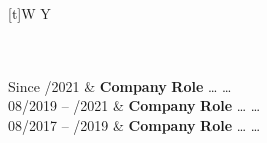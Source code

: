 \begin{xltabular}{\textwidth}[t]{W Y}

 \hrulefill \\ \\ 

Since /2021 			&	\textbf{Company} \newline
						\textbf{Role} \newline
						\dots \newline
						\dots \newline
						\\
					
08/2019 – /2021 			&	\textbf{Company} \newline
						\textbf{Role} \newline
						\dots \newline
						\dots \newline
						\\

					
08/2017 – /2019 			&	\textbf{Company} \newline
						\textbf{Role} \newline
						\dots \newline
						\dots \newline
						\\


\end{xltabular}